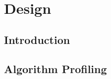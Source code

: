 \chapter{Design}
\label{ch:design}

\section{Introduction}
\label{sec:designIntroduction}


\section{Algorithm Profiling}
\label{sec:algorithmProfiling}

